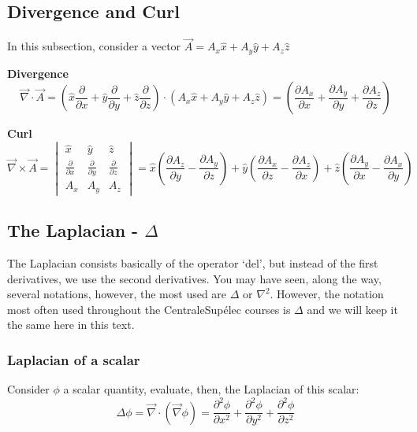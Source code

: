 \documentclass[11pt]{article}
\theoremstyle{definition}
\begin{document}
\subsection{Divergence and Curl}
In this subsection, consider a vector $\vec{A} = A_{x}\hat{x}+A_{y}\hat{y}+A_{z}\hat{z}$
\begin{shaded}
\textbf{Divergence} \newline
\begin{equation}
\vec{\nabla}\cdot \vec{A} = \left(\hat{x}\frac{\partial}{\partial x}+\hat{y}\frac{\partial}{\partial y}+\hat{z}\frac{\partial}{\partial z}\right) \cdot (A_{x}\hat{x}+A_{y}\hat{y}+A_{z}\hat{z})
                          = \left(\frac{\partial A_{x}}{\partial x}+\frac{\partial A_{y}}{\partial y}+\frac{\partial A_{z}}{\partial z}\right)
\end{equation}
\end{shaded}

\begin{shaded}
    \textbf{Curl} \newline
    \begin{equation}
    \vec{\nabla}\times \vec{A} = \begin{vmatrix}
        \hat{x} & \hat{y} & \hat{z}\\ 
        \frac{\partial}{\partial x} & \frac{\partial}{\partial y} & \frac{\partial}{\partial z}\\
        A_{x} & A_{y} & A_{z} 
   \end{vmatrix}
    = \hat{x}\left(\frac{\partial A_{z}}{\partial y}-\frac{\partial A_{y}}{\partial z}\right)+\hat{y}\left(\frac{\partial A_{x}}{\partial z}-\frac{\partial A_{z}}{\partial x}\right)+\hat{z}\left(\frac{\partial A_{y}}{\partial x}-\frac{\partial A_{x}}{\partial y}\right)
    \end{equation}
\end{shaded}

\subsection{The Laplacian - $\Delta$}
The Laplacian consists basically of the operator `del', but instead of the first derivatives, we use the second derivatives.
You may have seen, along the way, several notations, however, the most used are $\Delta$ or $\nabla^2$. However,
the notation most often used throughout the CentraleSupélec courses is $\Delta$ and we will keep it the same here in this text.
\subsubsection{Laplacian of a scalar}
Consider $\phi$ a scalar quantity, evaluate, then, the Laplacian of this scalar:
\begin{equation}
    \Delta \phi = \vec{\nabla} \cdot \left(\vec{\nabla} \phi\right)
                = \frac{\partial^2 \phi}{\partial x^2}+\frac{\partial^2 \phi}{\partial y^2}+\frac{\partial^2 \phi}{\partial z^2}
\end{equation}
\end{document}
